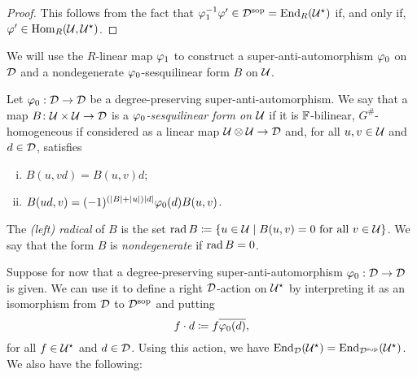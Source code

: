 \begin{proof}
    This follows from the fact that $ \varphi_1^{-1} \varphi' \in  \mathcal{D}^{\mathrm{sop}} = \operatorname{End}_R(\mathcal U^\star)$ if, and only if, $\varphi' \in \operatorname{Hom}_R(\mathcal U, \mathcal U^\star)$.
\end{proof}


We will use 
the $R$-linear map 
$\varphi_1$ to construct a super-anti-automorphism $\varphi_0$ on $\mathcal{D}$ and a nondegenerate $\varphi_0$-sesquilinear form $B$ on $\mathcal U$. 

\begin{defi}\label{def:sesquilinear-form}
    Let $\varphi_0: \mathcal{D} \to \mathcal{D}$ be a degree-preserving su\-per\--an\-ti\--auto\-mor\-phism. We say that a map $B\colon \mathcal U \times \mathcal U \to \mathcal{D}$ is a \emph{$\varphi_0$-sesquilinear form on $\mathcal U$} if it is $\mathbb{F}$-bilinear, $G^\#$-homogeneous if considered as a linear map $\mathcal U\otimes \mathcal U \to \mathcal{D}$ and, for all $u,v \in \mathcal U$ and $d\in \mathcal{D}$, satisfies
    \begin{enumerate}[(i)]
        \item $B(u,vd) = B(u,v)d$; \label{enum:linear-on-the-second}
        \item $B(ud, v) = (-1)^ {(|B| + |u|)|d|}\varphi_0(d) B(u, v)$. \label{enum:vphi0-linear-on-the-first}
    \end{enumerate}
    
    The \emph{(left) radical} of $B$ is the set $\operatorname{rad} B \coloneqq \{u\in \mathcal U \mid B(u, v) = 0 \text{ for all } v\in \mathcal U\}$. We say that the form $B$ is \emph{nondegenerate} if $\operatorname{rad} B = 0$.
\end{defi}

Suppose for now that a degree-preserving su\-per\--an\-ti\--auto\-mor\-phism $\varphi_0: \mathcal{D} \to \mathcal{D}$ is given. 
We can use it to define a right $\mathcal{D}$-action on $\mathcal U^\star$ by interpreting it as an isomorphism from $\mathcal{D}$ to $\mathcal{D}^{\mathrm{sop}}$ and putting 
%
\begin{equation}\label{eq:right-D-action}
    f\cdot d \coloneqq f \overline{\varphi_0(d)},
\end{equation}
%
for all $f \in \mathcal U^\star$ and $d\in \mathcal{D}$. 
Using this action, we have $\operatorname{End}_{\mathcal{D}} (\mathcal U^\star) = \operatorname{End}_{\mathcal{D}^{\mathrm{sop}}} (\mathcal U^\star)$. We also have the following:

